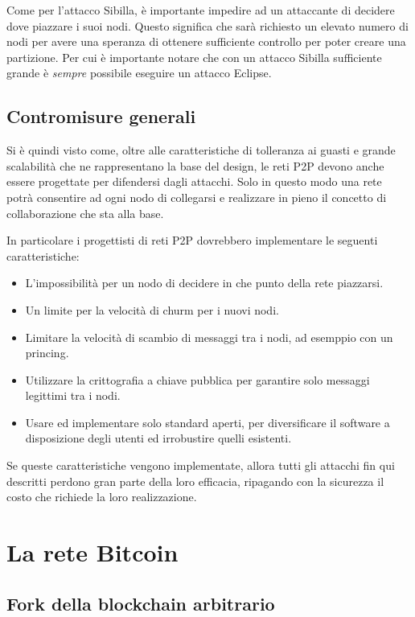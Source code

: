 Come per l'attacco Sibilla, è importante impedire ad un attaccante di decidere dove piazzare i suoi nodi. Questo significa che sarà richiesto un elevato numero di nodi per avere una speranza di ottenere sufficiente controllo per poter creare una partizione. Per cui è importante notare che con un attacco Sibilla sufficiente grande è \emph{sempre} possibile eseguire un attacco Eclipse.

\subsection{Contromisure generali}\label{contromisure-generali}

Si è quindi visto come, oltre alle caratteristiche di tolleranza ai guasti e grande scalabilità che ne rappresentano la base del design, le reti P2P devono anche essere progettate per difendersi dagli attacchi. Solo in questo modo una rete potrà consentire ad ogni nodo di collegarsi e realizzare in pieno il concetto di collaborazione che sta alla base.

In particolare i progettisti di reti P2P dovrebbero implementare le seguenti caratteristiche:

\begin{itemize}
\itemsep1pt\parskip0pt
\item
  L'impossibilità per un nodo di decidere in che punto della rete   piazzarsi.
\item
  Un limite per la velocità di churm per i nuovi nodi.
\item
  Limitare la velocità di scambio di messaggi tra i nodi, ad esemppio   con un princing.
\item
  Utilizzare la crittografia a chiave pubblica per garantire solo   messaggi legittimi tra i nodi.
\item
  Usare ed implementare solo standard aperti, per diversificare il   software a disposizione degli utenti ed irrobustire quelli esistenti.
\end{itemize}

Se queste caratteristiche vengono implementate, allora tutti gli attacchi fin qui descritti perdono gran parte della loro efficacia, ripagando con la sicurezza il costo che richiede la loro realizzazione.

\section{La rete Bitcoin}\label{la-rete-bitcoin}

\subsection{Fork della blockchain arbitrario}

